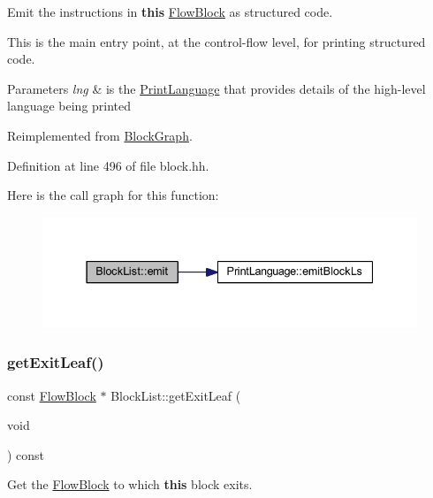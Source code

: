Emit the instructions in {\bfseries{this}} \mbox{\hyperlink{class_flow_block}{Flow\+Block}} as structured code. 

This is the main entry point, at the control-\/flow level, for printing structured code. 
\begin{DoxyParams}{Parameters}
{\em lng} & is the \mbox{\hyperlink{class_print_language}{Print\+Language}} that provides details of the high-\/level language being printed \\
\hline
\end{DoxyParams}


Reimplemented from \mbox{\hyperlink{class_block_graph_a535d3c7cb13e5e45b6e121b024fa339f}{Block\+Graph}}.



Definition at line 496 of file block.\+hh.

Here is the call graph for this function\+:
\nopagebreak
\begin{figure}[H]
\begin{center}
\leavevmode
\includegraphics[width=337pt]{class_block_list_a391529d850ca5f97c74acee00c080c43_cgraph}
\end{center}
\end{figure}
\mbox{\label{class_block_list_afa30fcb7c819884d7bbfe07548b4253d}} 
\subsubsection{\texorpdfstring{getExitLeaf()}{getExitLeaf()}}
{\footnotesize\ttfamily const \mbox{\hyperlink{class_flow_block}{Flow\+Block}} $\ast$ Block\+List\+::get\+Exit\+Leaf (\begin{DoxyParamCaption}\item[{void}]{ }\end{DoxyParamCaption}) const\hspace{0.3cm}{\ttfamily [virtual]}}



Get the \mbox{\hyperlink{class_flow_block}{Flow\+Block}} to which {\bfseries{this}} block exits. 



